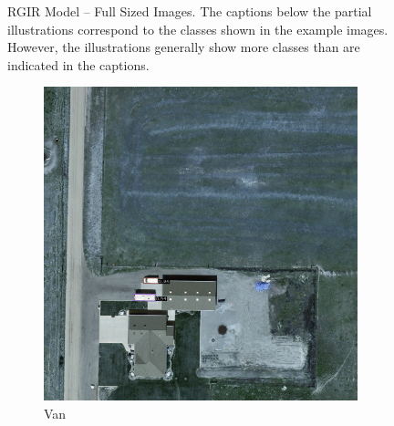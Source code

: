 \begin{figure}[h!]
    \caption[RGIR Model – Full Sized Images]{RGIR Model – Full Sized Images. The captions below the partial illustrations correspond to the classes shown in the example images. However, the illustrations generally show more classes than are indicated in the captions.}
    \label{fig:rgir_perm_exp_examples_fs}
\end{figure}


\begin{figure}[h!]
    \centering
    \begin{subfigure}[t]{0.38\textwidth}
        \centering
        \includegraphics[width=\linewidth]{images/015Results/02perm_exp/comp_images/rgbndvi/198.png}
        \caption{Van}
    \end{subfigure}
    \begin{subfigure}[t]{0.38\textwidth}
        \centering

\end{subfigure}
\end{figure}

